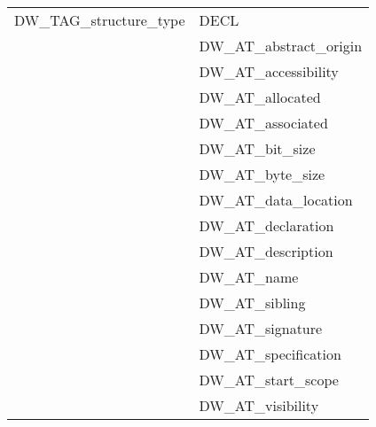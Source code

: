 \begin{longtable}{l|p{8cm}}
DW\_TAG\_structure\_type
&DECL  \\
&DW\_AT\_abstract\_origin  \\
&DW\_AT\_accessibility  \\
&DW\_AT\_allocated  \\
&DW\_AT\_associated  \\
&DW\_AT\_bit\_size  \\
&DW\_AT\_byte\_size  \\
&DW\_AT\_data\_location  \\
&DW\_AT\_declaration  \\
&DW\_AT\_description  \\
&DW\_AT\_name  \\
&DW\_AT\_sibling  \\
&DW\_AT\_signature  \\
&DW\_AT\_specification  \\
&DW\_AT\_start\_scope  \\
&DW\_AT\_visibility  \\


\end{longtable}
